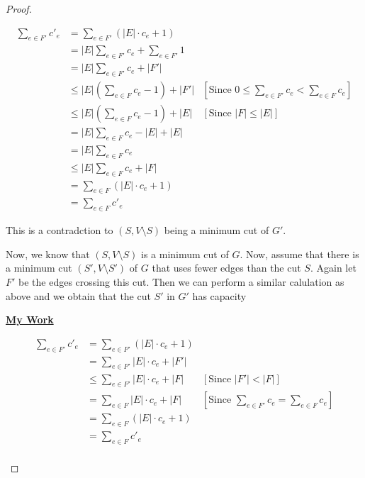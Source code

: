 \documentclass[12pt]{article}
\begin{document}
\begin{enumerate}[1.]
\begin{proof}
\begin{mdframed}
    \begin{align}
        \sum\limits_{e \in F'} c'_e &= \sum\limits_{e \in F'} (\lvert E \rvert \cdot c_e + 1)\\
        &= \lvert E \rvert \sum\limits_{e \in F'} c_e + \sum\limits_{e \in F'} 1\\
        &= \lvert E \rvert \sum\limits_{e \in F'} c_e + \lvert F' \rvert\\
        &\leq \lvert E \rvert (\sum\limits_{e \in F}c_e - 1) + \lvert F' \rvert & [\text{Since $0 \leq \sum\limits_{e \in F'} c_e < \sum\limits_{e \in F}c_e$}]\\
        &\leq \lvert E \rvert (\sum\limits_{e \in F}c_e - 1) + \lvert E \rvert & [\text{Since $\lvert F \rvert \leq \lvert E \rvert$}]\\
        &= \lvert E \rvert \sum\limits_{e \in F}c_e - \lvert E \rvert + \lvert E \rvert\\
        &= \lvert E \rvert \sum\limits_{e \in F}c_e\\
        &\leq \lvert E \rvert \sum\limits_{e \in F}c_e + \lvert F \rvert\\
        &= \sum\limits_{e \in F}(\lvert E \rvert \cdot c_e + 1)\\
        &= \sum\limits_{e \in F}c'_e
    \end{align}
    \end{mdframed}

    This is a contradction to $(S, V \setminus S)$ being a minimum cut of $G'$.

    \bigskip

    Now, we know that $(S, V \setminus S)$ is a minimum cut of $G$. Now, assume that there
    is a minimum cut $(S', V \setminus S')$ of $G$ that uses fewer edges than the cut $S$.
    Again let $F'$ be the edges crossing this cut. Then we can perform a similar calulation
    as above and we obtain that the cut $S'$ in $G'$ has capacity

    \begin{mdframed}
    \underline{\textbf{My Work}}

    \begin{align}
        \sum\limits_{e \in F'} c'_e &= \sum\limits_{e \in F'} (\lvert E \rvert \cdot c_e + 1)\\
        &= \sum\limits_{e \in F'} \lvert E \rvert \cdot c_e + \lvert F' \rvert\\
        &\leq \sum\limits_{e \in F'} \lvert E \rvert \cdot c_e + \lvert F \rvert & [\text{Since $\lvert F' \rvert < \lvert F \rvert$}]\\
        &= \sum\limits_{e \in F} \lvert E \rvert \cdot c_e + \lvert F \rvert & [\text{Since $\sum\limits_{e \in F'} c_e = \sum\limits_{e \in F} c_e$}]\\
        &= \sum\limits_{e \in F}(\lvert E \rvert \cdot c_e + 1)\\
        &= \sum\limits_{e \in F}c'_e\\
    \end{align}
    \end{mdframed}


\end{proof}
\end{enumerate}
\end{document}
